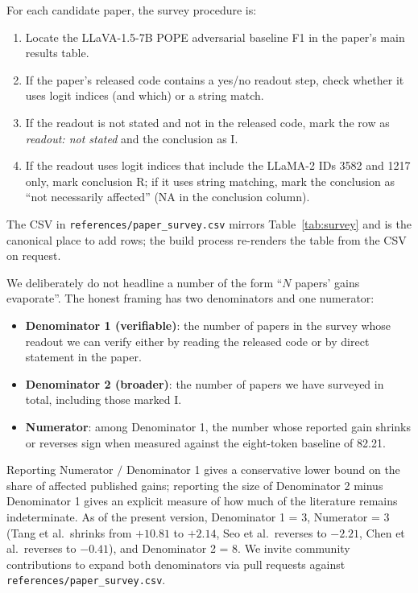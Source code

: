 \documentclass{article}
\begin{document}
For each candidate paper, the survey procedure is:

\begin{enumerate}
\item Locate the LLaVA-1.5-7B POPE adversarial baseline F1 in the
      paper's main results table.
\item If the paper's released code contains a yes/no readout step,
      check whether it uses logit indices (and which) or a string
      match.
\item If the readout is not stated and not in the released code,
      mark the row as \emph{readout: not stated} and the conclusion
      as I.
\item If the readout uses logit indices that include the LLaMA-2 IDs
      3582 and 1217 only, mark conclusion R; if it uses string
      matching, mark the conclusion as ``not necessarily affected''
      (NA in the conclusion column).
\end{enumerate}

The CSV in \texttt{references/paper\_survey.csv} mirrors
Table~\ref{tab:survey} and is the canonical place to add rows;
the build process re-renders the table from the CSV on request.

We deliberately do not headline a number of the form ``$N$ papers'
gains evaporate''. The honest framing has two denominators and one
numerator:

\begin{itemize}
\item \textbf{Denominator 1 (verifiable)}: the number of papers in
      the survey whose readout we can verify either by reading the
      released code or by direct statement in the paper.
\item \textbf{Denominator 2 (broader)}: the number of papers we have
      surveyed in total, including those marked I.
\item \textbf{Numerator}: among Denominator 1, the number whose
      reported gain shrinks or reverses sign when measured against
      the eight-token baseline of 82.21.
\end{itemize}

Reporting Numerator $/$ Denominator 1 gives a conservative lower
bound on the share of affected published gains; reporting the size
of Denominator 2 minus Denominator 1 gives an explicit measure of
how much of the literature remains indeterminate. As of the present
version, Denominator 1 = 3, Numerator = 3 (Tang et al.\ shrinks from
$+10.81$ to $+2.14$, Seo et al.\ reverses to $-2.21$, Chen et al.\
reverses to $-0.41$), and Denominator 2 = 8. We invite community
contributions to expand both denominators via pull requests against
\texttt{references/paper\_survey.csv}.
\end{document}
